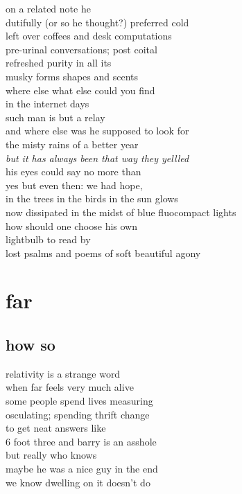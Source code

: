 \documentclass{article}
\begin{document}
on a related note he\\
dutifully (or so he thought?) preferred cold\\
left over coffees and desk computations\\
pre-urinal conversations; post coital\\
refreshed purity in all its\\
musky forms shapes and scents\\
where else what else could you find\\
in the internet days\\
such man is but a relay\\
and where else was he supposed to look for\\
the misty rains of a better year\\


\textit{but it has always been that way they yellled} \\
his eyes could say no more than\\
yes but even then: we had hope,\\
in the trees in the birds in the sun glows\\
now dissipated in the midst of blue fluocompact lights\\
how should one choose his own\\
lightbulb to read by\\
lost psalms and poems of soft beautiful agony\\


\clearpage


\section{far}
\subsection{how so}

relativity is a strange word\\
when far feels very much alive\\
some people spend lives measuring\\
osculating; spending thrift change\\
to get neat answers like\\
6 foot three and barry is an asshole\\
but really who knows\\
maybe he was a nice guy in the end\\
we know dwelling on it doesn't do\\
\end{document}
